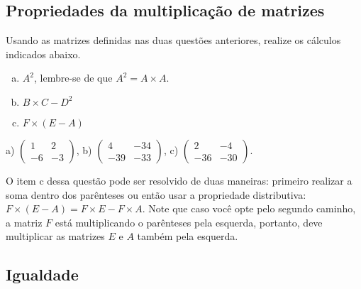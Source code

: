 \documentclass[main_estudante.tex]{subfiles}
\begin{document}
\subsection*{Propriedades da multiplicação de matrizes}

\begin{questao}
Usando as matrizes definidas nas duas questões anteriores, realize os cálculos indicados abaixo.
\begin{enumerate}[a)]
\item $A^2$, lembre-se de que $A^2=A \times A$.
\item $B \times C - D^2$
\item $F \times (E-A)$ 
\end{enumerate}
\end{questao}

\begin{gabarito}
	\begin{gabaritoQuestao}
		a) $\begin{pmatrix} 1 & 2 \\ -6 & -3\end{pmatrix}$, b) $\begin{pmatrix} 4 & -34 \\ -39 & -33\end{pmatrix}$, c) $\begin{pmatrix} 2 & -4 \\ -36 & -30\end{pmatrix}$.
	\end{gabaritoQuestao}
\end{gabarito}

O item c dessa questão pode ser resolvido de duas maneiras: primeiro realizar a soma dentro dos parênteses ou então usar a propriedade distributiva: $F \times (E-A) = F \times E - F \times A$. Note que caso você opte pelo segundo caminho, a matriz $F$ está multiplicando o parênteses pela esquerda, portanto, deve multiplicar as matrizes $E$ e $A$ também pela esquerda.

\subsection*{Igualdade}
\end{document}
